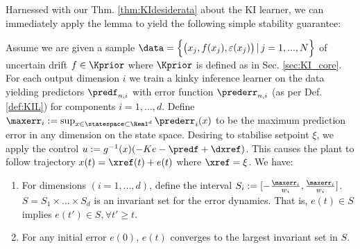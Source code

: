 Harnessed with our Thm. \ref{thm:KIdesiderata} about the KI learner, we can immediately apply the lemma to yield the following simple stability guarantee:
\begin{thm}\label{thm:KIvelocagstab}
Assume we are given a sample $\data=\Bigl\{\bigl(x_j, f(x_j), \varepsilon(x_j) \bigr) \,|\, j=1,...,N\Bigr\}$ of uncertain drift $f \in \Kprior$ where $\Kprior$ is defined as in Sec. \ref{sec:KI_core}. For each output dimension $i$ we train a kinky inference learner on the data yielding predictors $\predf_{n,i}$ with error function $\prederr_{n,i}$ (as per Def. \ref{def:KIL}) for components $i=1,...,d$. Define $\maxerr_i := \sup_{ x \in \statespace \subset \Real^d} \prederr_i(x)$ to be the maximum prediction error in any dimension on the state space. 
Desiring to stabilise setpoint $\xi$, we apply the control $u:= g^{-1}(x) ( -K e - \predf + \dxref)$. This causes the plant to follow trajectory $x(t) = \xref(t) + e(t)$ where $\xref = \xi$.
We have:
\begin{enumerate}
	\item  For dimensions $(i=1,...,d)$, define the interval $S_i:= [- \frac{\maxerr_i}{w_i}, \frac{\maxerr_i}{w_i}]$. 
 $S=S_1 \times \ldots \times S_d$ is an invariant set for the error dynamics. That is, $e(t) \in S $ implies $e(t') \in S, \forall t'\geq t$.
	\item For any initial error $e(0)$, $e(t)$ converges to the largest invariant set in $S$.
\end{enumerate}

\end{thm}
